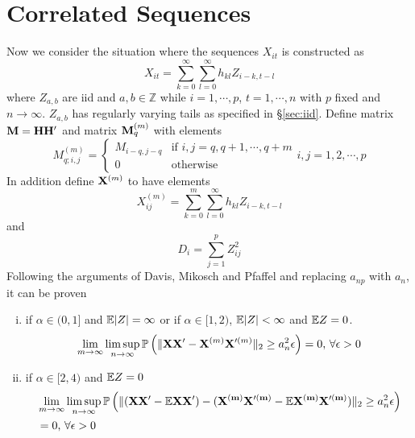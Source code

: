 \documentclass{article}
\begin{document}
\section{Correlated Sequences}
Now we consider the situation where the sequences $X_{it}$ is
constructed as
\[
X_{it} = \sum_{k=0}^{\infty} \sum_{l=0}^{\infty} h_{kl} Z_{i-k, t-l}
\]
where $Z_{a,b}$ are iid and $a,b \in \mathbb{Z}$ while $i=1,\cdots,p$,
$t=1,\cdots,n$ with $p$ fixed and $n \to \infty$. $Z_{a,b}$ has
regularly varying tails as specified in \S\ref{sec:iid}.
Define matrix $\mathbf{M} = \mathbf{H H'}$ and matrix $\mathbf{M}^{(m)}_q$ with
elements
\[
M^{(m)}_{q; i,j} = \left\{
  \begin{array}{ll}
    M_{i-q, j-q} & \text{if } i,j = q, q+1, \cdots, q+m \\
    0 & \text{otherwise}
  \end{array}
\right.
i,j = 1,2,\cdots,p
\]
In addition define $\mathbf{X}^{(m)}$ to have elements
\[
X^{(m)}_{ij} = \sum_{k=0}^{m} \sum_{l=0}^{\infty} h_{kl} Z_{i-k, t-l}
\]
and
\[
D_i = \sum_{j=1}^p Z_{ij}^2
\]
Following the arguments of Davis, Mikosch and
Pfaffel\cite{Mikosch2014} and replacing $a_{np}$ with $a_n$, it can be
proven
\begin{enumerate}[i)]
\item if $\alpha \in (0, 1]$ and $\mathbb{E}|Z| = \infty$ or if $\alpha \in
  [1, 2)$, $\mathbb{E}|Z| < \infty$ and $\mathbb{E} Z = 0$.
  \[
  \lim_{m\to \infty} \limsup_{n\to\infty} \mathbb{P}\left(
    \|\mathbf{X X'} - \mathbf{X}^{(m)} \mathbf{X}'^{(m)}\|_2 \geq a_n^2 \epsilon
  \right) = 0 \text{, } \forall \epsilon > 0  
  \]
\item if $\alpha \in [2, 4)$ and $\mathbb{E} Z = 0$
  \begin{align*}
    & \lim_{m\to \infty} \limsup_{n\to\infty} \mathbb{P}\left(
      \|(\mathbf{XX'} - \mathbb{E}\mathbf{XX'}) - (\mathbf{X^{(m)} X'^{(m)}} - \mathbb{E}
      \mathbf{X^{(m)} X'^{(m)}})\|_2 \geq a_n^2 \epsilon \right) \\
    &= 0 \text{, } \forall \epsilon > 0
  \end{align*}
\end{enumerate}
\end{document}
